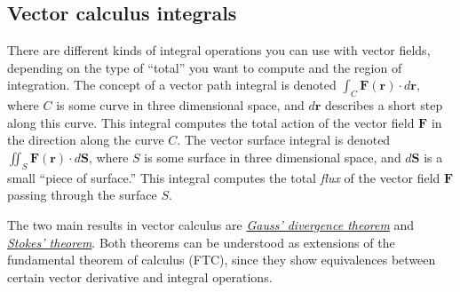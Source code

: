 	\subsection{Vector calculus integrals}

		There are different kinds of integral operations you can use with vector fields,
		depending on the type of ``total'' you want to compute
		and the region of integration.
		The concept of a vector path integral is denoted
		$\int_C \mathbf{F}(\mathbf{r}) \cdot d\mathbf{r}$,
		where $C$ is some curve in three dimensional space,
		and $d\mathbf{r}$ describes a short step along this curve.
		This integral computes the total action of the vector field $\mathbf{F}$
		in the direction along the curve $C$.
		The vector surface integral is denoted
		$\iint_S \mathbf{F}(\mathbf{r}) \cdot d\mathbf{S}$,
		where $S$ is some surface in three dimensional space,
		and $d\mathbf{S}$ %
		is a small ``piece of surface.''
		This integral computes the total \emph{flux} of the vector field $\mathbf{F}$
		passing through the surface $S$.


		The two main results in vector calculus
		are \href{https://en.wikipedia.org/wiki/Divergence_theorem}{\emph{Gauss' divergence theorem}}
		and \href{https://en.wikipedia.org/wiki/Stokes's_theorem}{\emph{Stokes' theorem}}.
		Both theorems can be understood as extensions of the fundamental theorem of calculus (FTC),
		since they show equivalences between
		certain vector derivative and integral operations.



